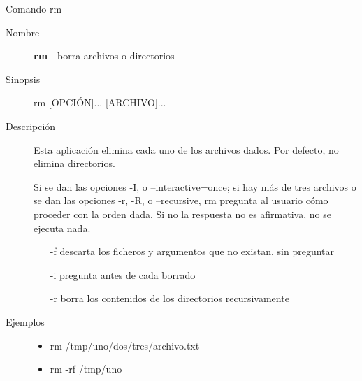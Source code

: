 \begin{frame}[c]{Comando rm}
  \begin{description}
    \item[Nombre]
      \textbf{rm} - borra archivos o directorios

    \vspace{\baselineskip}
    \item[Sinopsis]
      rm [OPCIÓN]... [ARCHIVO]...

    \vspace{\baselineskip}
    \item[Descripción]
      Esta aplicación elimina cada uno de los archivos dados. Por defecto,
      no elimina directorios.

      Si se dan las opciones -I, o --interactive=once; si hay más de tres
      archivos o se dan las opciones -r, -R, o --recursive, rm pregunta al
      usuario cómo proceder con la orden dada. Si no la respuesta no es
      afirmativa, no se ejecuta nada.

      \begin{itemize}
        \item [-f] descarta los ficheros y argumentos que no existan,
          sin preguntar
        \item [-i] pregunta antes de cada borrado
        \item [-r] borra los contenidos de los directorios recursivamente
      \end{itemize}

    \vspace{\baselineskip}
    \item[Ejemplos]
      \begin{itemize}
        \item rm /tmp/uno/dos/tres/archivo.txt
        \item rm -rf /tmp/uno
      \end{itemize}
  \end{description}
\end{frame}

